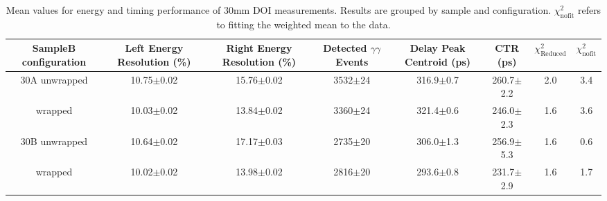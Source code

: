 \begin{table}
\caption{\label{tab:doictrresults} Mean values for energy and timing performance of 30mm DOI measurements. Results are grouped by sample and configuration. $\chi^2_\text{nofit}$ refers to fitting the weighted mean to the data.}
\begin{tabular}{cccccccc}
\hline
SampleB configuration & Left Energy Resolution (\%) & Right Energy Resolution (\%) & Detected $\gamma\gamma$ Events & Delay Peak Centroid (ps)  & CTR (ps) &  $\chi^2_\text{Reduced}$ &  $\chi^2_\text{nofit}$ \\
\hline
30A     unwrapped     &  10.75$\pm$0.02 &  15.76$\pm$0.02 &  3532$\pm$24 &  316.9$\pm$0.7 &  260.7$\pm$2.2 &        2.0 &    3.4 \\
        wrapped       &  10.03$\pm$0.02 &  13.84$\pm$0.02 &  3360$\pm$24 &  321.4$\pm$0.6 &  246.0$\pm$2.3 &        1.6 &    3.6 \\
30B     unwrapped     &  10.64$\pm$0.02 &  17.17$\pm$0.03 &  2735$\pm$20 &  306.0$\pm$1.3 &  256.9$\pm$5.3 &        1.6 &    0.6 \\
        wrapped       &  10.02$\pm$0.02 &  13.98$\pm$0.02 &  2816$\pm$20 &  293.6$\pm$0.8 &  231.7$\pm$2.9 &        1.6 &    1.7 \\
\hline
\end{tabular}
\end{table}

